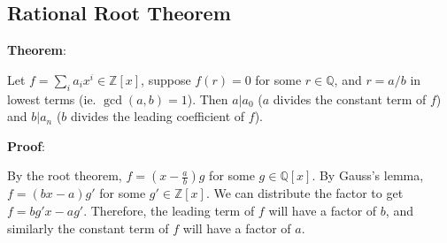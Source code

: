 \documentclass{article}
\begin{document}
\begin{multicols*}{2}
\section{Rational Root Theorem}

\textbf{Theorem}:

Let $f = \sum_{i}a_ix^i \in \mathbb{Z}[x]$, suppose $f(r) = 0$ for some $r \in \mathbb{Q}$, and $r = a/b$ in lowest terms (ie. $\gcd(a,b)=1$). Then $a|a_0$ ($a$ divides the constant term of $f$) and $b|a_n$ ($b$ divides the leading coefficient of $f$).

\textbf{Proof}:

By the root theorem, $f = (x - \frac{a}{b})g$ for some $g \in \mathbb{Q}[x]$. By Gauss's lemma, $f = (bx - a)g'$ for some $g' \in \mathbb{Z}[x]$. We can distribute the factor to get $f = bg'x - ag'$. Therefore, the leading term of $f$ will have a factor of $b$, and similarly the constant term of $f$ will have a factor of $a$.


\end{multicols*}
\end{document}
